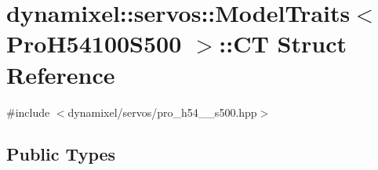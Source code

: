 \hypertarget{structdynamixel_1_1servos_1_1_model_traits_3_01_pro_h54100_s500_01_4_1_1_c_t}{}\section{dynamixel\+:\+:servos\+:\+:Model\+Traits$<$ Pro\+H54100\+S500 $>$\+:\+:C\+T Struct Reference}
\label{structdynamixel_1_1servos_1_1_model_traits_3_01_pro_h54100_s500_01_4_1_1_c_t}


{\ttfamily \#include $<$dynamixel/servos/pro\+\_\+h54\+\_\+\_\+s500.\+hpp$>$}

\subsection*{Public Types}
